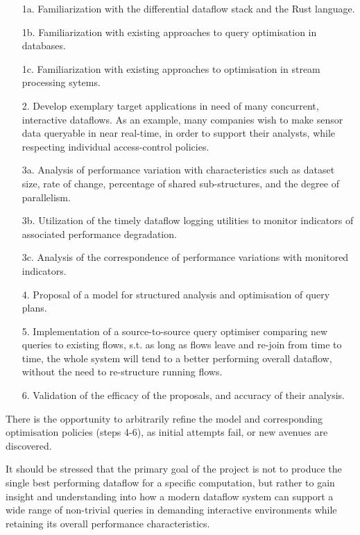 \documentclass[a4paper,10pt]{article}
\begin{document}
\begin{itemize}

\item[1a.] Familiarization with the differential dataflow stack and the Rust language.
\item[1b.] Familiarization with existing approaches to query optimisation in databases.
\item[1c.] Familiarization with existing approaches to optimisation in stream processing sytems.

\item[2.] Develop exemplary target applications in need of many
  concurrent, interactive dataflows. As an example, many companies
  wish to make sensor data queryable in near real-time, in order to
  support their analysts, while respecting individual access-control
  policies.

\item[3a.] Analysis of performance variation with characteristics such
  as dataset size, rate of change, percentage of shared
  sub-structures, and the degree of parallelism.
\item[3b.] Utilization of the timely dataflow logging utilities to
  monitor indicators of associated performance degradation.
\item[3c.] Analysis of the correspondence of performance variations
  with monitored indicators.

\item[4.] Proposal of a model for structured analysis and optimisation
  of query plans.

\item[5.] Implementation of a source-to-source query optimiser
  comparing new queries to existing flows, s.t. as long as flows leave
  and re-join from time to time, the whole system will tend to a
  better performing overall dataflow, without the need to re-structure
  running flows.

\item[6.] Validation of the efficacy of the proposals, and accuracy of
  their analysis.

\end{itemize}

There is the opportunity to arbitrarily refine the model and
corresponding optimisation policies (steps 4-6), as initial attempts
fail, or new avenues are discovered.

It should be stressed that the primary goal of the project is not to
produce the single best performing dataflow for a specific
computation, but rather to gain insight and understanding into how a
modern dataflow system can support a wide range of non-trivial queries
in demanding interactive environments while retaining its overall
performance characteristics.
\end{document}
